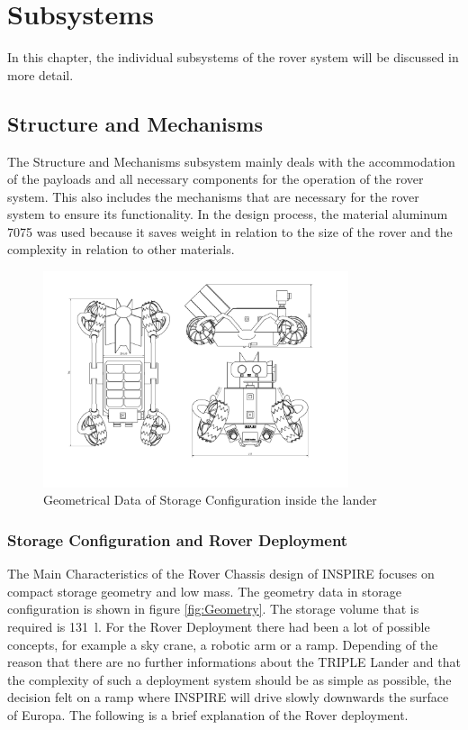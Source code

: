 \chapter{Subsystems}
\label{chap:subsystems}

In this chapter, the individual subsystems of the rover system will be discussed in more detail.

\section{Structure and Mechanisms}
\label{sec:mechanics}

The Structure and Mechanisms subsystem mainly deals with the accommodation of the payloads and all necessary components for the operation of the rover system. This also includes the mechanisms that are necessary for the rover system to ensure its functionality. 
In the design process, the material aluminum 7075 \cite{ref_tcs_12} was used because it saves weight in relation to the size of the rover and the complexity in relation to other materials.

\begin{figure}[htb]
     \centering
     \includegraphics[width=0.8\textwidth]{Media/INSPIRE_blackwhite.pdf}
     \caption{Geometrical Data of Storage Configuration inside the lander}
     \label{fig:Geometry}
\end{figure}



\subsection{Storage Configuration and Rover Deployment}

The Main Characteristics of the Rover Chassis design of INSPIRE focuses on compact storage geometry and low mass.  
The geometry data in storage configuration is shown in figure \autoref{fig:Geometry}.
The storage volume that is required is 131~l.
For the Rover Deployment there had been a lot of possible concepts, for example a sky crane, a robotic arm or a ramp. Depending of the reason that there are no further informations about the TRIPLE Lander and that the complexity of such a deployment system should be as simple as possible, the decision felt on a ramp where INSPIRE will drive slowly downwards the surface of Europa.
The following is a brief explanation of the Rover deployment.
 
